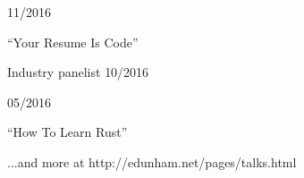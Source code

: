 \documentclass[11pt]{article} %
\begin{document}
\begin{description}
\squish

           {}
           {11/2016}

    ``Your Resume Is Code''

           {Industry panelist}
           {10/2016}

           {}
           {05/2016}

    ``How To Learn Rust''

%

%

%

%

%

%

%

%

%

%

\hfill \small ...and more at http://edunham.net/pages/talks.html

\end{description}
\end{document}
